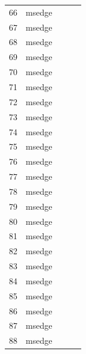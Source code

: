 \documentclass[a4paper,twoside,12pt]{book}
\begin{document}
\begin{appendices}
\begin{table}
\begin{tabular}{lllll}
	66  &         msedge &                &                &                \\
	67  &         msedge &                &                &                \\
	68  &         msedge &                &                &                \\
	69  &         msedge &                &                &                \\
	70  &         msedge &                &                &                \\
	71  &         msedge &                &                &                \\
	72  &         msedge &                &                &                \\
	73  &         msedge &                &                &                \\
	74  &         msedge &                &                &                \\
	75  &         msedge &                &                &                \\
	76  &         msedge &                &                &                \\
	77  &         msedge &                &                &                \\
	78  &         msedge &                &                &                \\
	79  &         msedge &                &                &                \\
	80  &         msedge &                &                &                \\
	81  &         msedge &                &                &                \\
	82  &         msedge &                &                &                \\
	83  &         msedge &                &                &                \\
	84  &         msedge &                &                &                \\
	85  &         msedge &                &                &                \\
	86  &         msedge &                &                &                \\
	87  &         msedge &                &                &                \\
	88  &         msedge &                &                &                \\

\end{tabular}
\end{table}
\end{appendices}
\end{document}
